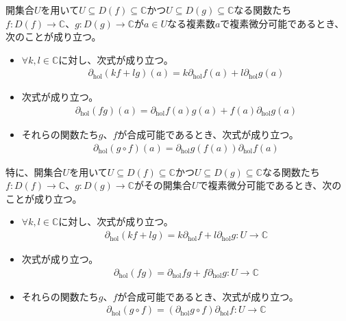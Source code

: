\documentclass[dvipdfmx]{jsarticle}
\begin{document}
\begin{thm}\label{4.2.8.4}
開集合$U$を用いて$U \subseteq D(f) \subseteq \mathbb{C}$かつ$U \subseteq D(g) \subseteq \mathbb{C}$なる関数たち$f:D(f) \rightarrow \mathbb{C}$、$g:D(g) \rightarrow \mathbb{C}$が$a \in U$なる複素数$a$で複素微分可能であるとき、次のことが成り立つ。
\begin{itemize}
\item
  $\forall k,l \in \mathbb{C}$に対し、次式が成り立つ。
\begin{align*}
\partial_{\mathrm{hol}}(kf + lg)(a) = k\partial_{\mathrm{hol}}f(a) + l\partial_{\mathrm{hol}}g(a)
\end{align*}
\item
  次式が成り立つ。
\begin{align*}
\partial_{\mathrm{hol}}(fg)(a) = \partial_{\mathrm{hol}}f(a)g(a) + f(a)\partial_{\mathrm{hol}}g(a)
\end{align*}
\item
  それらの関数たち$g$、$f$が合成可能であるとき、次式が成り立つ。
\begin{align*}
\partial_{\mathrm{hol}}(g \circ f)(a) = \partial_{\mathrm{hol}}g\left( f(a) \right)\partial_{\mathrm{hol}}f(a)
\end{align*}
\end{itemize}\par
特に、開集合$U$を用いて$U \subseteq D(f) \subseteq \mathbb{C}$かつ$U \subseteq D(g) \subseteq \mathbb{C}$なる関数たち$f:D(f) \rightarrow \mathbb{C}$、$g:D(g) \rightarrow \mathbb{C}$がその開集合$U$で複素微分可能であるとき、次のことが成り立つ。
\begin{itemize}
\item
  $\forall k,l \in \mathbb{C}$に対し、次式が成り立つ。
\begin{align*}
\partial_{\mathrm{hol}}(kf + lg) = k\partial_{\mathrm{hol}}f + l\partial_{\mathrm{hol}}g:U \rightarrow \mathbb{C}
\end{align*}
\item
  次式が成り立つ。
\begin{align*}
\partial_{\mathrm{hol}}(fg) = \partial_{\mathrm{hol}}fg + f\partial_{\mathrm{hol}}g:U \rightarrow \mathbb{C}
\end{align*}
\item
  それらの関数たち$g$、$f$が合成可能であるとき、次式が成り立つ。
\begin{align*}
\partial_{\mathrm{hol}}(g \circ f) = \left( \partial_{\mathrm{hol}}g \circ f \right)\partial_{\mathrm{hol}}f:U \rightarrow \mathbb{C}
\end{align*}
\end{itemize}
\end{thm}
\end{document}
